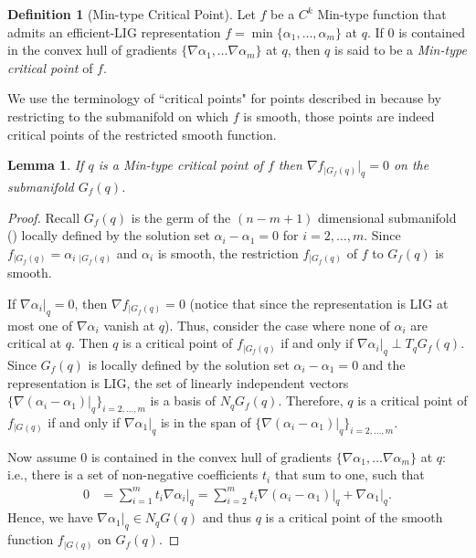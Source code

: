 \documentclass[11pt]{article}
\theoremstyle{plain}
\newtheorem{lem}{Lemma}
\theoremstyle{definition}
\newtheorem{defi}{Definition}
\theoremstyle{remark}
\begin{document}
	\begin{defi}[Min-type Critical Point]\label{def:q_mintype_crit}  Let $f$ be a $C^k$ Min-type function that admits an efficient-LIG representation $f = \min \{ \alpha_1, \ldots, \alpha_m\}$ at $q$. If $0$ is contained in the convex hull of gradients $\{ \nabla \alpha_1 ,\ldots  \nabla \alpha_m \}$ at $q$, then $q$ is said to be a \emph{Min-type critical point} of $f$.
	\end{defi}
	
	We use the terminology of ``critical points" for points described in  because by restricting to the submanifold on which $f$ is smooth, those points are indeed critical points of the restricted smooth function.
	
	\begin{lem} \label{lem:q_mintype_crit} If $q$ is a Min-type critical point of $f$ then $\nabla f_{\rvert G_f(q)}\rvert_q= 0$ on the submanifold $G_f(q)$.
	\end{lem}
	
	\begin{proof}
		Recall $G_f(q)$ is the germ of the $(n-m+1)$ dimensional submanifold () locally defined by the solution set  $\alpha_i - \alpha_1 = 0$ for $i= 2,\ldots, m$. Since $f_{\rvert G_f(q)} = \alpha_i {\ }_{\rvert G_f(q)}$ and $\alpha_i$ is smooth, the restriction $f_{\rvert G_f(q)}$ of $f$ to $G_f(q)$ is smooth. 
		
		If $\nabla \alpha_i\rvert_q = 0$,  then $\nabla f_{\rvert G_f(q)} = 0$ (notice that since the representation is LIG at most one of $ \nabla \alpha_i$ vanish at $q$). Thus, consider the case where none of $\alpha_i$ are critical at $q$. Then $q$ is a critical point of $f_{\rvert G_f(q)}$ if and only if $\nabla \alpha_i\rvert_{q} \perp T_q G_f(q)$. Since $G_f(q)$ is locally defined by the solution set  $\alpha_i - \alpha_1 = 0$ and the representation is LIG, the set of linearly independent vectors $\{\nabla (\alpha_i -  \alpha_1)\rvert_{q}\}_{i= 2,\ldots, m}$ is a basis of $N_qG_f(q)$. Therefore, $q$ is a critical point of $f_{\rvert G(q)}$ if and only if $\nabla  \alpha_1\rvert_{q}$ is in the span of $\{\nabla (\alpha_i -  \alpha_1)\rvert_{q}\}_{i= 2,\ldots, m}$. 
		
		Now assume $0$ is contained in the convex hull of gradients $\{ \nabla \alpha_1 ,\ldots  \nabla \alpha_m \}$ at $q$: i.e., there is a set of non-negative coefficients $t_i$ that sum to one, such that
		\begin{align*}
			0 &= \sum_{i=1}^m t_i \nabla \alpha_i \rvert_{q} =  \sum_{i= 2}^m t_i \nabla (\alpha_i - \alpha_1) \rvert_{q} + \nabla  \alpha_1\rvert_{q}.
		\end{align*}
		Hence, we have $\nabla  \alpha_1\rvert_{q} \in N_q G(q)$ and thus $q$ is a critical point of the smooth function $f_{\rvert G(q)}$ on $G_f(q)$.
	\end{proof}
	
\end{document}
